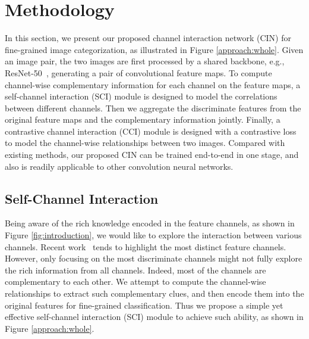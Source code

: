 \documentclass[letterpaper]{article} \usepackage{aaai20}  \usepackage{times}  \usepackage{helvet} \usepackage{courier}  \usepackage[hyphens]{url}  \usepackage{graphicx} \urlstyle{rm} \def\UrlFont{\rm}  \usepackage{graphicx}  \frenchspacing  \setlength{\pdfpagewidth}{8.5in}  \setlength{\pdfpageheight}{11in}  \usepackage{amsmath,amssymb}
\begin{document}
\section{Methodology}

In this section, we present our proposed channel interaction network (CIN) for fine-grained image categorization, as illustrated in  Figure \ref{approach:whole}.
Given an image pair, the two images are first processed by a shared backbone, e.g., ResNet-50~\cite{DBLP:conf/cvpr/HeZRS16}, generating a pair of convolutional feature maps.
To compute channel-wise complementary information for each channel on the feature maps, a self-channel interaction (SCI) module is designed to model the correlations between different channels. Then we aggregate the discriminate features from the original feature maps and the complementary information jointly.
Finally, a contrastive channel interaction (CCI) module is designed with a contrastive loss to model the channel-wise relationships between two images. Compared with existing methods, our proposed CIN can be trained end-to-end in one stage, and also is readily applicable to other convolution neural networks.


\subsection{Self-Channel Interaction}
\label{sec:sa}

Being aware of the rich knowledge encoded in the feature channels, as shown in Figure \ref{fig:introduction}, we would like to explore the interaction between various channels.
Recent work~\cite{DBLP:journals/corr/abs-1709-01507,DBLP:conf/eccv/SunYZD18} tends to highlight the most distinct feature channels.
However, only focusing on the most discriminate channels might not fully explore the rich information from all channels.
Indeed, most of the channels are complementary to each other. We attempt to compute the channel-wise relationships to extract such complementary clues, and then encode them into the original features for fine-grained classification.
Thus we propose a simple yet effective self-channel interaction (SCI) module to achieve such ability, as shown in Figure \ref{approach:whole}.
\end{document}
